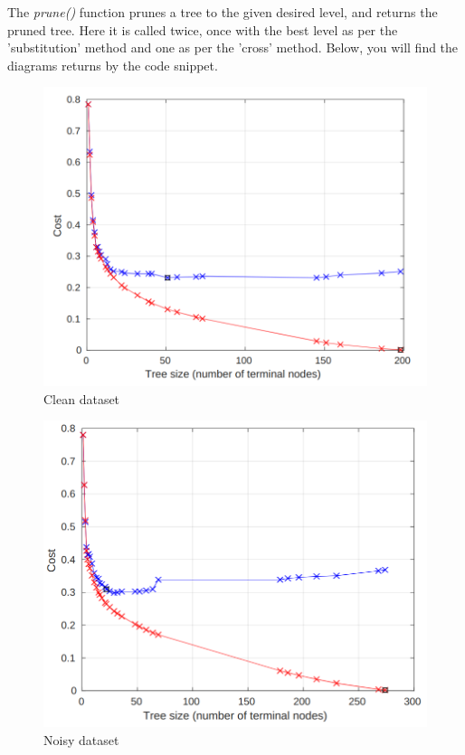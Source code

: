 The \emph{prune()} function prunes a tree to the given desired level, and returns the pruned tree.
Here it is called twice, once with the best level as per the 'substitution' method and one as per the 'cross' method.
Below, you will find the diagrams returns by the code snippet.



\begin{figure}[h]
    \caption{Clean dataset}
    \begin{center}
  \includegraphics[scale = 0.40]{graphs/clean_dataset/clean_pruning.png}
 \end{center}
  \end{figure}


 \begin{figure}[h]
    \begin{center}
    \caption{Noisy dataset}
  \includegraphics[scale = 0.40]{graphs/noisy_dataset/noisy_pruning.png} 
 \end{center}

  \end{figure}


